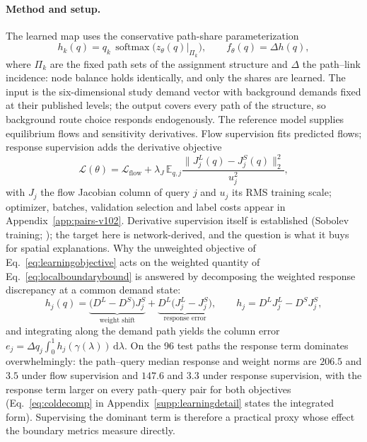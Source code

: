 \documentclass[a4paper,fleqn]{cas-sc}
\newcommand{\E}{\mathbb{E}}
\newcommand{\norm}[1]{\lVert #1 \rVert}
\begin{document}
\paragraph{Method and setup.}
The learned map uses the conservative path-share parameterization
\begin{equation}
h_k(q)=q_k\,\operatorname{softmax}\bigl(z_\theta(q)\bigr|_{\Pi_k}\bigr),
\qquad f_\theta(q)=\Delta h(q),
\label{eq:consparam}
\end{equation}
where $\Pi_k$ are the fixed path sets of the assignment structure and
$\Delta$ the path--link incidence: node balance holds identically, and
only the shares are learned. The input is the six-dimensional study
demand vector with background demands fixed at their published levels;
the output covers every path of the structure, so background route
choice responds endogenously. The reference model supplies equilibrium
flows and sensitivity derivatives. Flow supervision fits predicted
flows; response supervision adds the derivative objective
\begin{equation}
\mathcal L(\theta)=\mathcal L_{\mathrm{flow}}
+\lambda_J\,\E_{q,j}\frac{\norm{J_j^L(q)-J_j^S(q)}_2^2}{u_j^2},
\label{eq:learningobjective}
\end{equation}
with $J_j$ the flow Jacobian column of query $j$ and $u_j$ its RMS
training scale; optimizer, batches, validation selection and label
costs appear in Appendix~\ref{app:pairs-v102}. Derivative supervision
itself is established (Sobolev training;
\citealp{czarnecki2017sobolev,yuan2022sobolev}); the target here is
network-derived, and the question is what it buys for spatial
explanations.
Why the unweighted objective of Eq.~\eqref{eq:learningobjective} acts
on the weighted quantity of Eq.~\eqref{eq:localboundarybound} is
answered by decomposing the weighted response discrepancy at a common
demand state:
\begin{equation}
h_j(q)=\underbrace{\bigl(D^L-D^S\bigr)J_j^S}_{\text{weight shift}}
+\underbrace{D^L\bigl(J_j^L-J_j^S\bigr)}_{\text{response error}},
\qquad h_j=D^LJ_j^L-D^SJ_j^S,
\label{eq:coldecompmain}
\end{equation}
and integrating along the demand path yields the column error
$e_j=\Delta q_j\int_0^1h_j(\gamma(\lambda))\,\mathrm{d}\lambda$. On the
96 test paths the response term dominates overwhelmingly: the
path--query median response and weight norms are $206.5$ and $3.5$
under flow supervision and $147.6$ and $3.3$ under response
supervision, with the response term larger on every path--query pair
for both objectives (Eq.~\eqref{eq:coldecomp} in
Appendix~\ref{supp:learningdetail} states the integrated form).
Supervising the dominant term is therefore a
practical proxy whose effect the boundary metrics measure directly.
\end{document}
